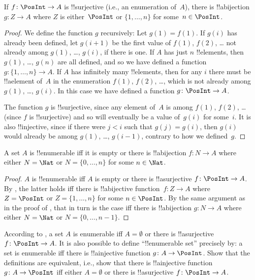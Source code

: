 \begin{prop}
If $f\colon \PosInt \to A$ is !!{surjective} (i.e., an enumeration
of~$A$), there is !!a{bijection} $g\colon Z \to A$ where $Z$ is
either~$\PosInt$ or $\{1, \dots, n\}$ for some~$n \in \PosInt$.
\end{prop}

\begin{proof}
  We define the function $g$ recursively: Let $g(1) = f(1)$. If $g(i)$
  has already been defined, let $g(i+1)$ be the first value of $f(1)$,
  $f(2)$, \dots{} not already among $g(1)$, \dots, $g(i)$, if there is
  one. If $A$ has just $n$ !!{element}s, then $g(1)$, \dots, $g(n)$ are all
  defined, and so we have defined a function $g\colon \{1, \dots, n\}
  \to A$. If $A$ has infinitely many !!{element}s, then for any $i$
  there must be !!a{element} of~$A$ in the enumeration $f(1)$, $f(2)$,
  \dots, which is not already among $g(1)$, \dots, $g(i)$. In this
  case we have defined a function $g\colon \PosInt \to A$.
  
  The function $g$ is !!{surjective}, since any element of~$A$ is
  among $f(1)$, $f(2)$, \dots{} (since $f$ is !!{surjective}) and so
  will eventually be a value of~$g(i)$ for some~$i$. It is also
  !!{injective}, since if there were $j < i$ such that $g(j) = g(i)$,
  then $g(i)$ would already be among $g(1)$, \dots, $g(i-1)$, contrary
  to how we defined~$g$.
\end{proof}

\begin{cor}
A set $A$ is !!{enumerable} iff it is empty or there is !!a{bijection}
$f\colon N \to A$ where either $N = \Nat$ or $N = \{0, \dots, n\}$ for
some $n \in \Nat$.
\end{cor}

\begin{proof}
$A$ is !!{enumerable} iff $A$ is empty or there is !!a{surjective}
$f\colon \PosInt \to A$. By , the latter holds
iff there is !!a{bijective} function~$f\colon Z \to A$ where $Z =
\PosInt$ or $Z = \{1, \dots, n\}$ for some $n \in \PosInt$. By the
same argument as in the proof of , that in turn
is the case iff there is !!a{bijection} $g\colon N \to A$ where either
$N = \Nat$ or $N = \{0, \dots, n-1\}$.
\end{proof}

\begin{prob}
  According to , a set $A$ is
  enumerable iff $A = \emptyset$ or there is !!a{surjective} $f\colon
  \PosInt \to A$.  It is also possible to define ``!!{enumerable} set''
  precisely by: a set is enumerable iff there is !!a{injective}
  function $g\colon A \to \PosInt$.  Show that the definitions are
  equivalent, i.e., show that there is !!a{injective} function
  $g\colon A \to \PosInt$ iff either $A = \emptyset$ or there is
  !!a{surjective} $f\colon \PosInt \to A$.
\end{prob}





